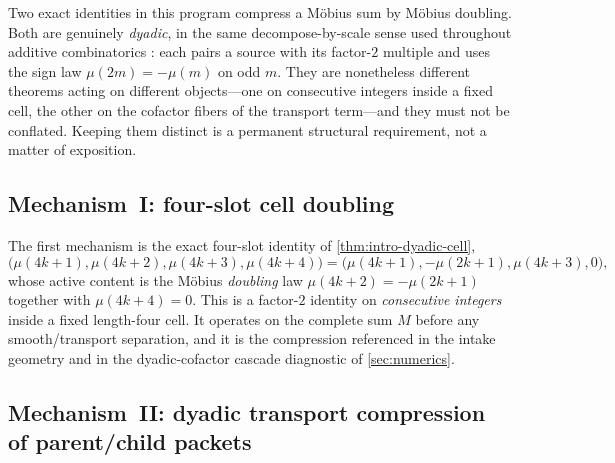 \documentclass[11pt]{article}
\theoremstyle{definition}
\newcommand{\1}{\mathbf{1}}
\begin{document}
Two exact identities in this program compress a M\"obius sum by M\"obius doubling.  Both are genuinely \emph{dyadic}, in the same decompose-by-scale sense used throughout additive combinatorics \cite{tao-vu}: each pairs a source with its factor-$2$ multiple and uses the sign law $\mu(2m)=-\mu(m)$ on odd $m$.  They are nonetheless different theorems acting on different objects---one on consecutive integers inside a fixed cell, the other on the cofactor fibers of the transport term---and they must not be conflated.  Keeping them distinct is a permanent structural requirement, not a matter of exposition.

\subsection{Mechanism~I: four-slot cell doubling}

The first mechanism is the exact four-slot identity of \cref{thm:intro-dyadic-cell},
\[
 \bigl(\mu(4k+1),\mu(4k+2),\mu(4k+3),\mu(4k+4)\bigr)
 =\bigl(\mu(4k+1),-\mu(2k+1),\mu(4k+3),0\bigr),
\]
whose active content is the M\"obius \emph{doubling} law $\mu(4k+2)=-\mu(2k+1)$ together with $\mu(4k+4)=0$.  This is a factor-$2$ identity on \emph{consecutive integers} inside a fixed length-four cell.  It operates on the complete sum $M$ before any smooth/transport separation, and it is the compression referenced in the intake geometry and in the dyadic-cofactor cascade diagnostic of \cref{sec:numerics}.

\subsection{Mechanism~II: dyadic transport compression of parent/child packets}
\end{document}
